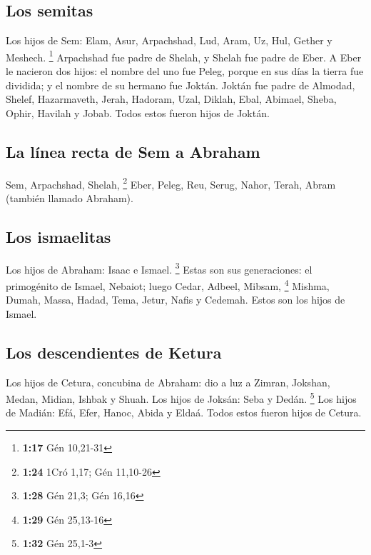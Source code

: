 \begin{paracol}{2}
\hypertarget{los-semitas}{%
\subsection{Los semitas}\label{los-semitas}}

 Los hijos de Sem: Elam, Asur, Arpachshad, Lud, Aram, Uz,
Hul, Gether y Meshech. \footnote{\textbf{1:17} Gén 10,21-31}
 Arpachshad fue padre de Shelah, y Shelah fue padre de
Eber.  A Eber le nacieron dos hijos: el nombre del uno
fue Peleg, porque en sus días la tierra fue dividida; y el nombre de su
hermano fue Joktán.  Joktán fue padre de Almodad, Shelef,
Hazarmaveth, Jerah,  Hadoram, Uzal, Diklah,
 Ebal, Abimael, Sheba,  Ophir, Havilah y
Jobab. Todos estos fueron hijos de Joktán.

\hypertarget{la-luxednea-recta-de-sem-a-abraham}{%
\subsection{La línea recta de Sem a
Abraham}\label{la-luxednea-recta-de-sem-a-abraham}}

 Sem, Arpachshad, Shelah, \footnote{\textbf{1:24} 1Cró
  1,17; Gén 11,10-26}  Eber, Peleg, Reu, 
Serug, Nahor, Terah,  Abram (también llamado Abraham).

\hypertarget{los-ismaelitas}{%
\subsection{Los ismaelitas}\label{los-ismaelitas}}

 Los hijos de Abraham: Isaac e Ismael. \footnote{\textbf{1:28}
  Gén 21,3; Gén 16,16}  Estas son sus generaciones: el
primogénito de Ismael, Nebaiot; luego Cedar, Adbeel, Mibsam, \footnote{\textbf{1:29}
  Gén 25,13-16}  Mishma, Dumah, Massa, Hadad, Tema,
 Jetur, Nafis y Cedemah. Estos son los hijos de Ismael.

\hypertarget{los-descendientes-de-ketura}{%
\subsection{Los descendientes de
Ketura}\label{los-descendientes-de-ketura}}

 Los hijos de Cetura, concubina de Abraham: dio a luz a
Zimran, Jokshan, Medan, Midian, Ishbak y Shuah. Los hijos de Joksán:
Seba y Dedán. \footnote{\textbf{1:32} Gén 25,1-3}  Los
hijos de Madián: Efá, Efer, Hanoc, Abida y Eldaá. Todos estos fueron
hijos de Cetura.


\end{paracol}
